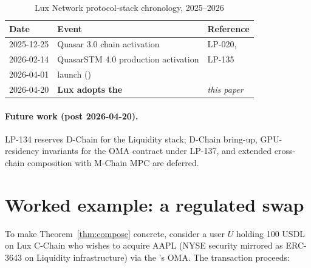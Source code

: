 \documentclass[11pt]{article}
\begin{document}
\begin{table}[h]
\centering
\caption{Lux Network protocol-stack chronology, 2025--2026}
\begin{tabular}{lll}
\toprule
Date & Event & Reference \\
\midrule
2025-12-25 & Quasar 3.0 chain activation
           & LP-020, \cite{quasar-cert} \\
2026-02-14 & QuasarSTM 4.0 production activation
           & LP-135 \\
2026-04-01 &  launch ()
           & \cite{lp-paper} \\
2026-04-20 & \textbf{Lux adopts the }
           & \emph{this paper} \\
\bottomrule
\end{tabular}
\end{table}

\paragraph{Future work (post 2026-04-20).}
LP-134 reserves D-Chain for the Liquidity stack; D-Chain bring-up,
GPU-residency invariants for the OMA contract under LP-137, and
extended cross-chain composition with M-Chain MPC are deferred.

\section{Worked example: a regulated swap}
\label{sec:example}

To make Theorem~\ref{thm:compose} concrete, consider a user $U$
holding 100 USDL on Lux C-Chain who wishes to acquire AAPL
(NYSE security mirrored as ERC-3643 on Liquidity infrastructure)
via the 's OMA. The transaction proceeds:
\end{document}
